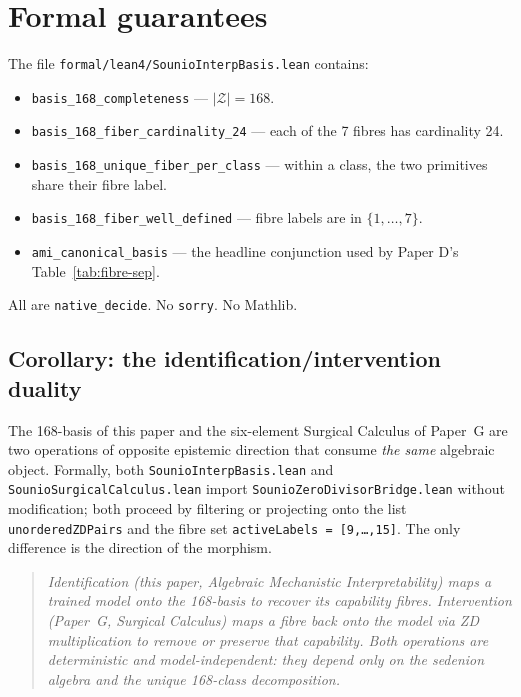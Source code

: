 \documentclass{article}
\begin{document}
\section{Formal guarantees}

The file \texttt{formal/lean4/SounioInterpBasis.lean} contains:

\begin{itemize}
\item \texttt{basis\_168\_completeness} --- $|\mathcal{Z}| = 168$.
\item \texttt{basis\_168\_fiber\_cardinality\_24} --- each of the 7
      fibres has cardinality 24.
\item \texttt{basis\_168\_unique\_fiber\_per\_class} --- within a
      class, the two primitives share their fibre label.
\item \texttt{basis\_168\_fiber\_well\_defined} --- fibre labels are
      in $\{1, \dots, 7\}$.
\item \texttt{ami\_canonical\_basis} --- the headline conjunction used
      by Paper D's Table~\ref{tab:fibre-sep}.
\end{itemize}

All are \texttt{native\_decide}.  No \texttt{sorry}.  No Mathlib.

\subsection{Corollary: the identification/intervention duality}
\label{sec:duality}

The 168-basis of this paper and the six-element Surgical Calculus of
Paper~G are two operations of opposite epistemic direction that consume
\emph{the same} algebraic object.  Formally, both \texttt{SounioInterpBasis.lean}
and \texttt{SounioSurgicalCalculus.lean} import \texttt{SounioZeroDivisorBridge.lean}
without modification; both proceed by filtering or projecting onto the
list \texttt{unorderedZDPairs} and the fibre set \texttt{activeLabels~=~[9,\ldots,15]}.
The only difference is the direction of the morphism.

\begin{quote}
\itshape Identification (this paper, Algebraic Mechanistic Interpretability)
maps a trained model onto the 168-basis to recover its capability fibres.
Intervention (Paper~G, Surgical Calculus) maps a fibre back onto the model
via ZD multiplication to remove or preserve that capability.
Both operations are deterministic and model-independent: they depend
only on the sedenion algebra and the unique 168-class decomposition.
\end{quote}
\end{document}
